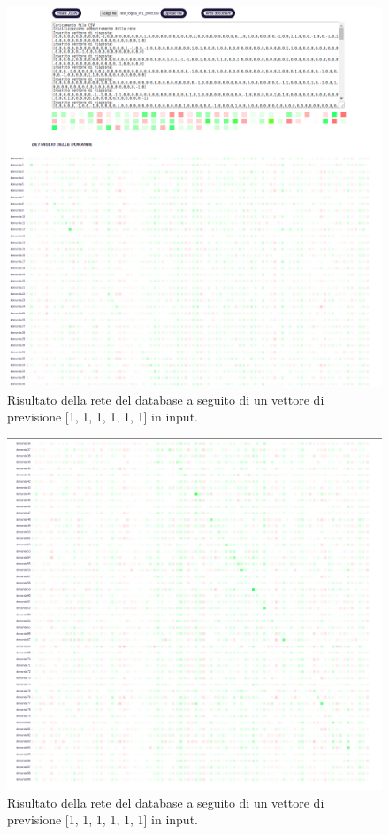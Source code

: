 \begin{figure}[H]
\centering
	\includegraphics[width=0.90\linewidth]{./image/rete_db-vp1architettura2.png}
	\caption{Risultato della rete del database a seguito di un vettore di previsione [1, 1, 1, 1, 1, 1] in input.}
\end{figure}

\begin{figure}[H]
\centering
	\includegraphics[width=0.90\linewidth]{./image/rete_db-vp1_2architettura2.png}
	\caption{Risultato della rete del database a seguito di un vettore di previsione [1, 1, 1, 1, 1, 1] in input.}
\end{figure}

